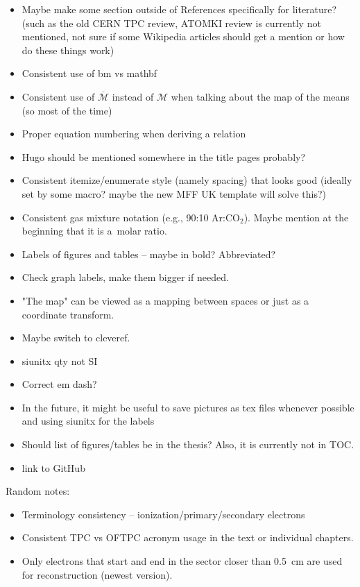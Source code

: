 {\begin{itemize}[topsep=4pt,itemsep=2pt]
				\item Maybe make some section outside of References specifically for literature? (such as the old CERN TPC review, ATOMKI review is currently not mentioned, not sure if some Wikipedia articles should get a mention or how do these things work)
				\item Consistent use of bm vs mathbf
				\item Consistent use of $\overbar{\mathcal{M}}$ instead of $\mathcal{M}$ when talking about the map of the means (so most of the time)
				\item Proper equation numbering when deriving a relation
				\item Hugo should be mentioned somewhere in the title pages probably?
				\item Consistent itemize/enumerate style (namely spacing) that looks good (ideally set by some macro? maybe the new MFF UK template will solve this?)
				\item Consistent gas mixture notation (e.g., 90:10 Ar:CO$_2$). Maybe mention at the beginning that it is a~molar ratio.
				\item Labels of figures and tables -- maybe in bold? Abbreviated?
				\item Check graph labels, make them bigger if needed.
				\item "The map" can be viewed as a mapping between spaces or just as a coordinate transform.
				\item Maybe switch to cleveref.
				\item siunitx qty not SI
				\item Correct em dash?
				\item In the future, it might be useful to save pictures as tex files whenever possible and using siunitx for the labels
				\item Should list of figures/tables be in the thesis? Also, it is currently not in TOC.
				\item link to GitHub
			\end{itemize}
		Random notes:
			\begin{itemize}[topsep=4pt,itemsep=2pt]
				\item Terminology consistency -- ionization/primary/secondary electrons
				\item Consistent \ac{TPC} vs \ac{OFTPC} acronym usage in the text or individual chapters.
				\item Only electrons that start and end in the sector closer than 0.5~cm are used for reconstruction (newest version).

\end{itemize}}
